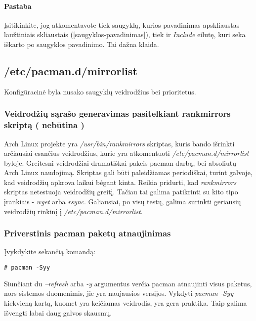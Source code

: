       \paragraph{Pastaba} Įsitikinkite, jog atkomentavote tiek
      saugyklą, kurios pavadinimas apskliaustas laužtiniais
      skliaustais ([saugyklos-pavadinimas]), tiek ir \textsl{Include} eilutę, kuri seka
      iškarto po saugyklos pavadinimo. Tai dažna klaida.

    \subsection{/etc/pacman.d/mirrorlist}

      Konfigūracinė byla nusako saugyklų veidrodžius bei prioritetus.

      \subsubsection{Veidrodžių sąrašo generavimas pasitelkiant
        rankmirrors skriptą ( nebūtina )}

        Arch Linux projekte yra \textsl{/usr/bin/rankmirrors}
        skriptas, kuris bando išrinkti arčiausiai esančius
        veidrodžius, kurie yra atkomentuoti
        \textsl{/etc/pacman.d/mirrorlist} byloje. Greitesni
        veidrodžiai dramatiškai pakeis pacman darbą, bei absoliutų
        Arch Linux naudojimą. Skriptas gali būti paleidžiamas
        periodiškai, turint galvoje, kad veidrodžių apkrova laikui
        bėgant kinta. Reikia pridurti, kad \textsl{rankmirrors}
        skriptas netestuoja veidrodžių greitį. Tačiau tai galima
        patikrinti su kito tipo įrankiais - \textsl{wget} arba
        \textsl{rsync}. Galiausiai, po visų testų, galima surinkti
        geriausių veidrodžių rinkinį į
        \textsl{/etc/pacman.d/mirrorlist}.

      \subsubsection{Priverstinis pacman paketų atnaujinimas}

        Įvykdykite sekančią komandą:

        \begin{verbatim}
# pacman -Syy
        \end{verbatim}

        Siunčiant du \textsl{--refresh} arba \textsl{-y} argumentus
        verčia pacman atnaujinti visus paketus, nors sistemos
        duomenimis, jie yra naujausios versijos. Vykdyti
        \textsl{pacman -Syy} kiekvieną kartą, kuomet yra keičiamas
        veidrodis, yra gera praktika. Taip galima išvengti labai daug
        galvos skausmų.


